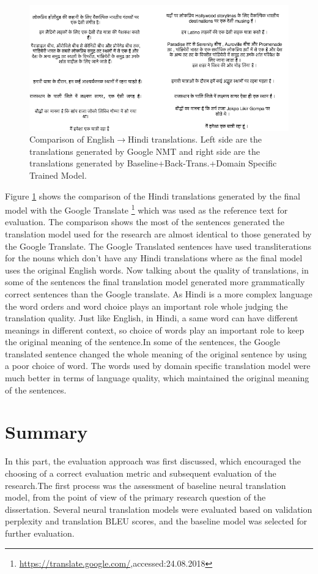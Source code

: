 \begin{figure}[H]
\includegraphics[width=\textwidth]{figures/translation2.png}
\caption{Comparison of English$\rightarrow$Hindi translations. Left side are the translations generated by Google NMT and right side are the translations generated by Baseline+Back-Trans.+Domain Specific Trained Model.} 
\label{translations2}
\end{figure}

Figure \ref{translations2} shows the comparison of the Hindi translations generated by the final model with the Google Translate \footnote{{\url{https://translate.google.com/},accessed:24.08.2018}} which was used as the reference text for evaluation. The comparison shows the most of the sentences generated the translation model used for the research are almost identical to those generated by the Google Translate. The Google Translated sentences have used transliterations for the nouns which don't have any Hindi translations where as the final model uses the original English words. Now talking about the quality of translations, in some of the sentences the final translation model generated more grammatically correct sentences than the Google translate. As Hindi is a more complex language the word orders and word choice plays an important role whole judging the translation quality. Just like English, in Hindi, a same word can have different meanings in different context, so choice of words play an important role to keep the original meaning of the sentence.In some of the sentences, the Google translated sentence changed the whole meaning of the original sentence by using a poor choice of word. The words used by domain specific translation model were much better in terms of language quality, which maintained the original meaning of the sentences.

\section{Summary}
In this part, the evaluation approach was first discussed, which encouraged the choosing of a correct evaluation metric and subsequent evaluation of the research.The first process was the assessment of baseline neural translation model, from the point of view of the primary research question of the dissertation. Several neural translation models were evaluated based on validation perplexity and translation BLEU scores, and the baseline model was selected for further evaluation.

